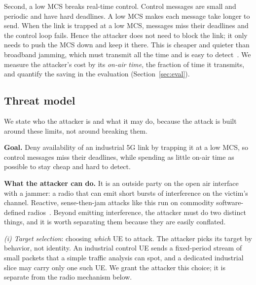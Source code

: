 \documentclass[conference]{IEEEtran}
\begin{document}
Second, a low MCS breaks real-time control. Control messages are small and periodic
and have hard deadlines. A low MCS makes each message take longer to send. When the
link is trapped at a low MCS, messages miss their deadlines and the control loop
fails. Hence the attacker does not need to block the link; it only needs to push the MCS
down and keep it there. This is cheaper and quieter than broadband jamming, which must
transmit all the time and is easy to detect~\cite{pelechrinis2011jammers}. We measure the
attacker's cost by its \emph{on-air time}, the fraction of time it transmits, and quantify
the saving in the evaluation (Section~\ref{sec:eval}).

\subsection{Threat model}
\label{sec:threat}
We state who the attacker is and what it may do, because the attack is built around
these limits, not around breaking them.

\textbf{Goal.} Deny availability of an industrial 5G link by trapping it at a low MCS,
so control messages miss their deadlines, while spending as little on-air time as
possible to stay cheap and hard to detect.

\textbf{What the attacker can do.} It is an outside party on the open air interface with
a jammer: a radio that can emit short bursts of interference on the victim's channel.
Reactive, sense-then-jam attacks like this run on commodity software-defined
radios~\cite{wilhelm2011reactive}. Beyond emitting interference, the attacker must do two
distinct things, and it is worth separating them because they are easily conflated.

\emph{(i) Target selection}: choosing \emph{which} UE to attack. The attacker picks its
target by behavior, not identity. An industrial control UE sends a fixed-period stream of
small packets that a simple traffic analysis can spot, and a dedicated industrial slice
may carry only one such UE. We grant the attacker this choice; it is separate from the
radio mechanism below.
\end{document}
